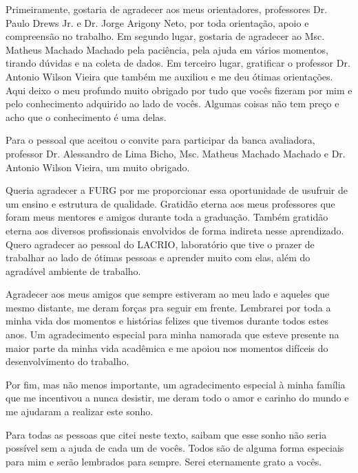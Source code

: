 
\begin{agradecimentos}[AGRADECIMENTOS]

Primeiramente, gostaria de agradecer aos meus orientadores, professores Dr. Paulo Drews Jr. e Dr. Jorge Arigony Neto, por toda orientação, apoio e compreensão no trabalho. 
Em segundo lugar, gostaria de agradecer ao Msc. Matheus Machado Machado pela paciência, pela ajuda em vários momentos, tirando dúvidas e na coleta de dados. 
Em terceiro lugar, gratificar o professor Dr. Antonio Wilson Vieira que também me auxiliou e me deu ótimas orientações. 
Aqui deixo o meu profundo muito obrigado por tudo que vocês fizeram por mim e pelo conhecimento adquirido ao lado de vocês.
Algumas coisas não tem preço e acho que o conhecimento é uma delas.

Para o pessoal que aceitou o convite para participar da banca avaliadora, professor Dr. Alessandro de Lima Bicho, Msc. Matheus Machado Machado e Dr. Antonio Wilson Vieira, um muito obrigado. 

Queria agradecer a FURG por me proporcionar essa oportunidade de usufruir de um ensino e estrutura de qualidade.
Gratidão eterna aos meus professores que foram meus mentores e amigos durante toda a graduação.
Também gratidão eterna aos diversos profissionais envolvidos de forma indireta nesse aprendizado. 
Quero agradecer ao pessoal do LACRIO, laboratório que tive o prazer de trabalhar ao lado de ótimas pessoas e aprender muito com elas, além do agradável ambiente de trabalho. 

Agradecer aos meus amigos que sempre estiveram ao meu lado e aqueles que mesmo distante, me deram forças pra seguir em frente.
Lembrarei por toda a minha vida dos momentos e histórias felizes que tivemos durante todos estes anos.
Um agradecimento especial para minha namorada que esteve presente na maior parte da minha vida acadêmica e me apoiou nos momentos difíceis do desenvolvimento do trabalho.

Por fim, mas não menos importante, um agradecimento especial à minha família que me incentivou a nunca desistir, me deram todo o amor e carinho do mundo e me ajudaram a realizar este sonho.

Para todas as pessoas que citei neste texto, saibam que esse sonho não seria possível sem a ajuda de cada um de vocês. Todos são de alguma forma especiais para mim e serão lembrados para sempre. Serei eternamente grato a vocês.


\end{agradecimentos}
